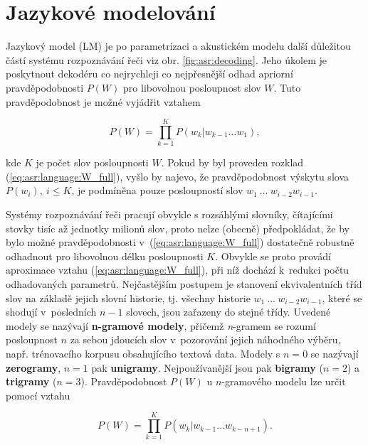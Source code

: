 \section{Jazykové modelování}
\label{chap:asr:language}

Jazykový model (LM) je po parametrizaci a akustickém modelu další důležitou částí systému rozpoznávání řeči viz obr. \ref{fig:asr:decoding}. Jeho úkolem je poskytnout dekodéru co nejrychleji co nejpřesnější odhad apriorní pravděpodobnosti $P\left(W\right)$ pro libovolnou posloupnost slov $W$. Tuto pravděpodobnost je možné vyjádřit vztahem

\begin{equation}
  P\left(W\right) = \prod_{k=1}^{K} P\left(w_k | w_{k-1}\dots w_{1}\right),
  \label{eq:asr:language:W_full}
\end{equation}

\noindent kde $K$ je počet slov posloupnosti $W$. Pokud by byl proveden rozklad (\ref{eq:asr:language:W_full}), vyšlo by najevo, že pravděpodobnost výskytu slova $P\left(w_i\right),\ i \leq K$, je podmíněna pouze posloupností slov $w_1\ \dots\ w_{i-2}w_{i-1}$.

Systémy rozpoznávání řeči pracují obvykle s rozsáhlými slovníky, čítajícími stovky tisíc až jednotky milionů slov, proto nelze (obecně) předpokládat, že by bylo možné pravděpodobnosti v~(\ref{eq:asr:language:W_full}) dostatečně robustně odhadnout pro libovolnou délku posloupnosti $K$.
Obvykle se proto provádí aproximace vztahu (\ref{eq:asr:language:W_full}), při níž dochází k~redukci počtu odhadovaných parametrů. Nejčastějším postupem je stanovení ekvivalentních tříd slov na základě jejich slovní historie, tj. všechny historie $w_1\ \dots\ w_{i-2}w_{i-1}$, které se shodují v~posledních $n-1$ slovech, jsou zařazeny do stejné třídy. Uvedené modely se nazývají \textbf{n-gramové modely}, přičemž \textit{n}-gramem se rozumí posloupnost $n$ za sebou jdoucích slov v~pozorování jejich náhodného výběru, např. trénovacího korpusu obsahujícího textová data. Modely s $n=0$ se nazývají \textbf{zerogramy}, $n=1$ pak \textbf{unigramy}. Nejpoužívanější jsou pak \textbf{bigramy} ($n=2$) a \textbf{trigramy} ($n=3$). Pravděpodobnost $P\left(W\right)$ u $n$-gramového modelu lze určit pomocí vztahu

\begin{equation}
  P\left(W\right) = \prod_{k=1}^{K} P\left(w_k | w_{k-1}\dots w_{k-n+1}\right).
  \label{eq:asr:language:W}
\end{equation}

